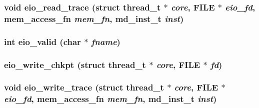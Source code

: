 \subsubsection[{eio\_\-read\_\-trace}]{\setlength{\rightskip}{0pt plus 5cm}void eio\_\-read\_\-trace (struct {\bf thread\_\-t} $\ast$ {\em core}, \/  FILE $\ast$ {\em eio\_\-fd}, \/  {\bf mem\_\-access\_\-fn} {\em mem\_\-fn}, \/  {\bf md\_\-inst\_\-t} {\em inst})}\label{eio_8h_1642b5a24fe5ea200e529f036a60450e}


\subsubsection[{eio\_\-valid}]{\setlength{\rightskip}{0pt plus 5cm}int eio\_\-valid (char $\ast$ {\em fname})}\label{eio_8h_b306a196e213133ac23b9f05811c76ce}


\subsubsection[{eio\_\-write\_\-chkpt}]{ eio\_\-write\_\-chkpt (struct {\bf thread\_\-t} $\ast$ {\em core}, \/  FILE $\ast$ {\em fd})}\label{eio_8h_a7afc328073078464c5e49983b650d89}


\subsubsection[{eio\_\-write\_\-trace}]{\setlength{\rightskip}{0pt plus 5cm}void eio\_\-write\_\-trace (struct {\bf thread\_\-t} $\ast$ {\em core}, \/  FILE $\ast$ {\em eio\_\-fd}, \/  {\bf mem\_\-access\_\-fn} {\em mem\_\-fn}, \/  {\bf md\_\-inst\_\-t} {\em inst})}\label{eio_8h_4a8ec71c7b59499f966b3f915e6e982a}


